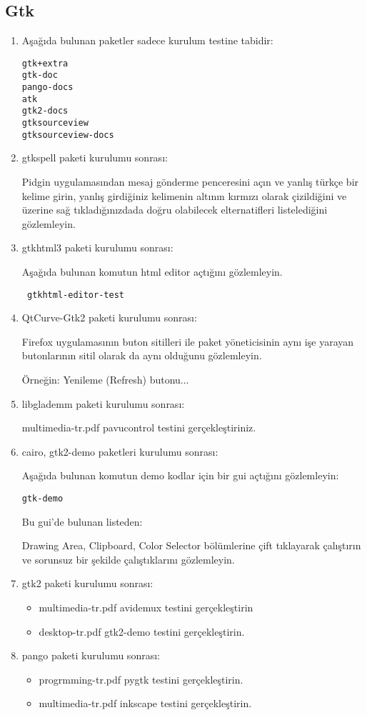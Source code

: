 \documentclass[a4paper,10pt]{article}
\begin{document}
\subsection*{Gtk}
\begin{enumerate}
\item Aşağıda bulunan paketler sadece kurulum testine tabidir:
\begin{verbatim}
gtk+extra
gtk-doc
pango-docs
atk
gtk2-docs
gtksourceview
gtksourceview-docs
\end{verbatim}

\item gtkspell paketi kurulumu sonrası:

  Pidgin uygulamasından mesaj gönderme penceresini açın ve yanlış türkçe bir kelime girin, yanlış girdiğiniz kelimenin altının kırmızı olarak çizildiğini ve üzerine sağ tıkladığınızdada doğru olabilecek elternatifleri listelediğini gözlemleyin.

\item gtkhtml3 paketi kurulumu sonrası:

Aşağıda bulunan komutun html editor açtığını gözlemleyin.
\begin{verbatim}
 gtkhtml-editor-test
\end{verbatim}

\item QtCurve-Gtk2 paketi kurulumu sonrası:

Firefox uygulamasının buton sitilleri ile paket yöneticisinin aynı işe yarayan butonlarının sitil olarak da aynı olduğunu gözlemleyin.

Örneğin: Yenileme (Refresh) butonu...
\item libglademm paketi kurulumu sonrası:

multimedia-tr.pdf pavucontrol testini gerçekleştiriniz.
 
 \item cairo,  gtk2-demo paketleri kurulumu sonrası: 

Aşağıda bulunan komutun demo kodlar için bir gui açtığını gözlemleyin:
\begin{verbatim}
gtk-demo
\end{verbatim}

Bu gui'de bulunan listeden:

Drawing Area, Clipboard, Color Selector bölümlerine çift tıklayarak çalıştırın ve sorunsuz bir şekilde çalıştıklarını gözlemleyin.

\item gtk2 paketi kurulumu sonrası: 
\begin{itemize}
 \item multimedia-tr.pdf avidemux testini gerçekleştirin
\item desktop-tr.pdf gtk2-demo testini gerçekleştirin.
\end{itemize}

\item pango paketi kurulumu sonrası: 
\begin{itemize}
 \item progrmming-tr.pdf pygtk testini gerçekleştirin.
 \item multimedia-tr.pdf inkscape testini gerçekleştirin.
\end{itemize}

\end{enumerate}
\end{document}
